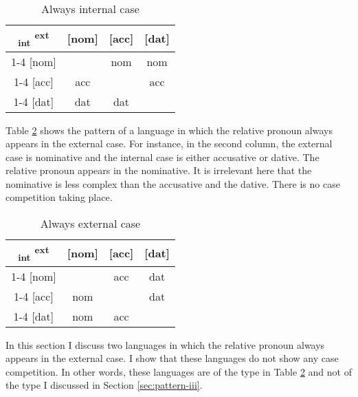 \begin{table}[H]
  \center
  \caption{Always internal case}
  \begin{tabular}{c|c|c|c}
    \toprule
   \textsubscript{\ac{int}} \textsuperscript{\ac{ext}}
          & [\ac{nom}]
          & [\ac{acc}]
          & [\ac{dat}]
          \\ \cmidrule{1-4}
      [\ac{nom}]
          &
          & \ac{nom}
          & \ac{nom}
          \\ \cmidrule{1-4}
      [\ac{acc}]
          & \ac{acc}
          &
          & \ac{acc}
          \\ \cmidrule{1-4}
      [\ac{dat}]
          & \ac{dat}
          & \ac{dat}
          &
          \\
    \bottomrule
  \end{tabular}
  \label{tbl:no-case-competition-int}
\end{table}

Table \ref{tbl:no-case-competition-ext} shows the pattern of a language in which the relative pronoun always appears in the external case. For instance, in the second column, the external case is nominative and the internal case is either accusative or dative. The relative pronoun appears in the nominative. It is irrelevant here that the nominative is less complex than the accusative and the dative. There is no case competition taking place.

\begin{table}[H]
  \center
  \caption{Always external case}
  \begin{tabular}{c|c|c|c}
    \toprule
   \textsubscript{\ac{int}} \textsuperscript{\ac{ext}}
          & [\ac{nom}]
          & [\ac{acc}]
          & [\ac{dat}]
          \\ \cmidrule{1-4}
      [\ac{nom}]
          &
          & \ac{acc}
          & \ac{dat}
          \\ \cmidrule{1-4}
      [\ac{acc}]
          & \ac{nom}
          &
          & \ac{dat}
          \\ \cmidrule{1-4}
      [\ac{dat}]
          & \ac{nom}
          & \ac{acc}
          &
          \\
    \bottomrule
  \end{tabular}
  \label{tbl:no-case-competition-ext}
\end{table}

In this section I discuss two languages in which the relative pronoun always appears in the external case. I show that these languages do not show any case competition. In other words, these languages are of the type in Table \ref{tbl:no-case-competition-ext} and not of the type I discussed in Section \ref{sec:pattern-iii}.





